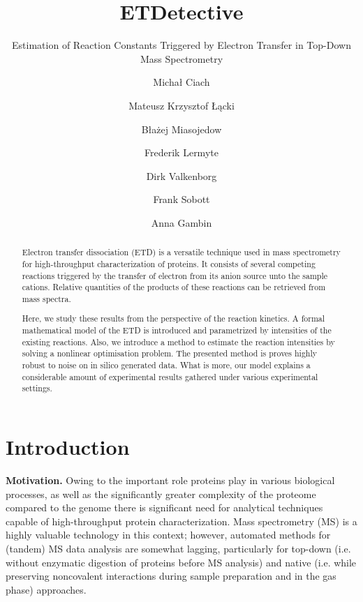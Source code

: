 \documentclass{llncs}
\begin{document}
\pagestyle{plain}
\title{ETDetective}
\subtitle{Estimation of Reaction Constants Triggered by Electron Transfer in Top-Down Mass Spectrometry}
\author{Michał Ciach \and Mateusz Krzysztof Łącki \and Błażej Miasojedow \and Frederik Lermyte \and Dirk Valkenborg \and Frank Sobott \and Anna Gambin }


\maketitle
\begin{abstract}
        Electron transfer dissociation (ETD) is a versatile technique used in mass spectrometry for high-throughput characterization of proteins. It consists of several competing reactions triggered by the transfer of electron from its anion source unto the sample cations. Relative quantities of the products of these reactions can be retrieved from mass spectra.

        Here, we study these results from the perspective of the reaction kinetics. A formal mathematical model of the ETD is introduced and parametrized by intensities of the existing reactions. Also, we introduce a method to estimate the reaction intensities by solving a nonlinear optimisation problem. The presented method is proves highly robust to noise on in silico generated data. What is more, our model explains a considerable amount of experimental results gathered under various experimental settings.
\end{abstract}

\section{Introduction}
\textbf{Motivation.}
        Owing to the important role proteins play in various biological processes, as well as the significantly greater complexity of the proteome compared to the genome \cite{Smith2013-km} there is significant need for analytical techniques capable of high-throughput protein characterization. Mass spectrometry (MS) is a highly valuable technology in this context; however, automated methods for (tandem) MS data analysis are somewhat lagging, particularly for top-down (i.e. without enzymatic digestion of proteins before MS analysis) and native (i.e. while preserving noncovalent interactions during sample preparation and in the gas phase) approaches.
\end{document}
